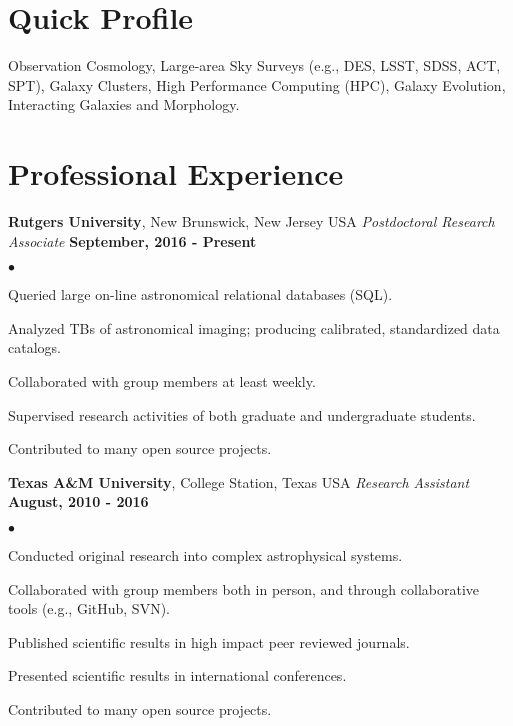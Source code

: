 \documentclass[margin,line, 11pt]{res}
\newenvironment{list2}{
  \begin{list}{$\bullet$}{%
      \setlength{\itemsep}{0in}
      \setlength{\parsep}{0in} \setlength{\parskip}{0in}
      \setlength{\topsep}{0in} \setlength{\partopsep}{0in} 
      \setlength{\leftmargin}{0.2in}}}{\end{list}}
\begin{document}
\begin{resume}
\section{Quick Profile}
Observation Cosmology, Large-area Sky Surveys (e.g., DES, LSST, SDSS, ACT, SPT), Galaxy Clusters, High Performance Computing (HPC), Galaxy Evolution, Interacting Galaxies and Morphology.
\vspace*{-5mm}

\section{Professional Experience}
\textbf{Rutgers University}, New Brunswick, New Jersey USA \newline
\textit{Postdoctoral Research Associate} \hfill \textbf{September, 2016 - Present}\newline
    \begin{list2}
    	\vspace*{-5mm}
    	\item Queried large on-line astronomical relational databases (SQL).
    	\item Analyzed TBs of astronomical imaging; producing calibrated, standardized data catalogs.
    	\item Collaborated with group members at least weekly.
    	\item Supervised research activities of both graduate and undergraduate students.
    	\item Contributed to many open source projects.
    \end{list2}
\vspace*{-5mm}

\textbf{Texas A\&M University}, College Station, Texas USA\newline
\textit{Research Assistant} \hfill \textbf{August, 2010 - 2016}\newline
    \begin{list2}
    	\vspace*{-5mm}
    	\item Conducted original research into complex astrophysical systems.
    	\item Collaborated with group members both in person, and through collaborative tools (e.g., GitHub, SVN).
    	\item Published scientific results in high impact peer reviewed journals.
    	\item Presented scientific results in international conferences.
    	\item Contributed to many open source projects.
    \end{list2}
\vspace*{-5mm}


\end{resume}
\end{document}
